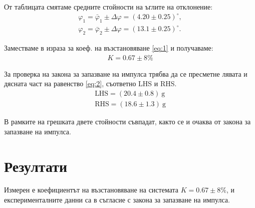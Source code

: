 \documentclass[aps, prb, twocolumn, a4paper, floatfix, reprint]{revtex4-2}
\newcommand{\degree}{^{\circ}}
\let\phi\varphi
\begin{document}
От таблицата смятаме средните стойности на ъглите на отклонение:
\begin{gather*}
    \phi_{1} = \bar{\phi}_{1} \pm \Delta\phi = (4.20 \pm 0.25)\degree,\\
    \phi_{2} = \bar{\phi}_{2} \pm \Delta\phi = (13.1 \pm 0.25)\degree.
\end{gather*}

Заместваме в израза за коеф. на възстановяване \eqref{eq:1} и получаваме:
\begin{gather*}
    K = 0.67 \pm 8 \%
\end{gather*}

За проверка на закона за запазване на импулса трябва да се пресметне лявата и дясната част на равенство \eqref{eq:2}, съответно LHS и RHS.
\begin{gather*}
    \text{LHS} = (20.4 \pm 0.8)~\text{g}\\
    \text{RHS} = (18.6 \pm 1.3)~\text{g}
\end{gather*}

В рамките на грешката двете стойности съвпадат, както се и очаква от закона за запазване на импулса.

\section{Резултати}

Измерен е коефициентът на възстановяване на системата $K = 0.67 \pm 8\%$, и експерименталните данни са в съгласие с закона за запазване на импулса.
\end{document}
